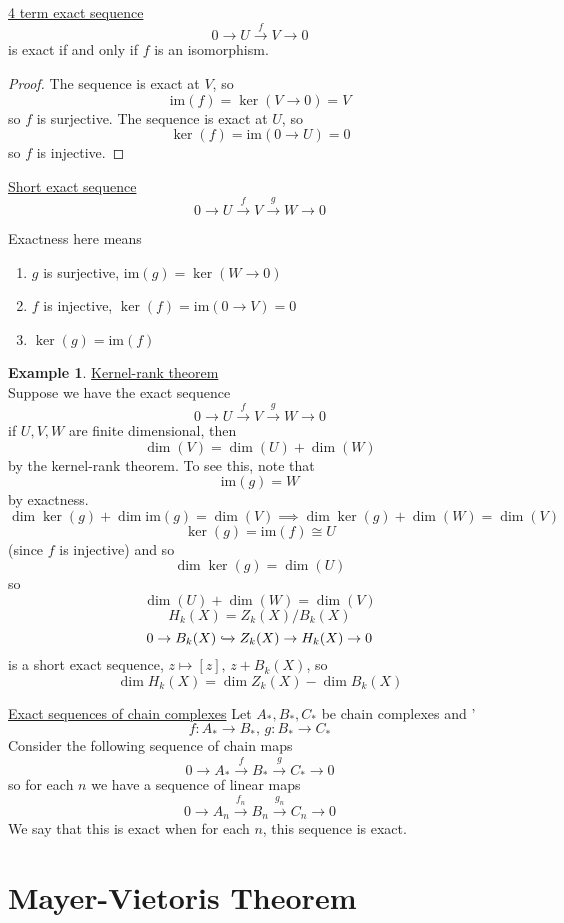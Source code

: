 \documentclass[a4paper,14pt]{extarticle}
\theoremstyle{definition}
\newtheorem*{eg}{Example}
\begin{document}
\noindent\underline{4 term exact sequence}
\[0\rightarrow U \xrightarrow{f} V\rightarrow 0\]
is exact if and only if $f$ is an isomorphism.

\begin{proof}
	The sequence is exact at $V$, so \[\text{im}(f)=\ker(V\rightarrow 0)=V\]
	so $f$ is surjective. The sequence is exact at $U$, so
	\[\ker(f)=\text{im}(0\rightarrow U)=0\] so $f$ is injective.
\end{proof}

\noindent\underline{Short exact sequence}
\[0\rightarrow U\xrightarrow{f} V\xrightarrow{g} W\rightarrow 0\]

Exactness here means
\begin{enumerate}
	\item $g$ is surjective, $\text{im}(g)=\ker(W\rightarrow 0)$
	\item $f$ is injective, $\ker(f)=\text{im}(0\rightarrow V)=0$
	\item $\ker(g)=\text{im}(f)$
\end{enumerate}

\begin{eg}
\underline{Kernel-rank theorem} \\
Suppose we have the exact sequence
\[0\rightarrow U\xrightarrow{f} V\xrightarrow{g} W\rightarrow 0\]
if $U,V,W$ are finite dimensional, then \[\dim(V)=\dim(U)+\dim(W)\] by the kernel-rank theorem.
To see this, note that \[\text{im}(g)=W\] by exactness.
\[\dim\ker(g)+\dim\text{im}(g)=\dim(V)\implies\dim\ker(g)+\dim(W)=\dim(V)\] \[\ker(g)=\text{im}(f)\cong U\] (since
$f$ is injective) and so 
\[\dim\ker(g)=\dim(U)\] so \[\dim(U)+\dim(W)=\dim(V)\]
\[H_k(X)=Z_k(X)/B_k(X)\]
\[0\rightarrow B_k(X)\xhookrightarrow{} Z_k(X)\rightarrow H_k(X)\rightarrow 0\]
is a short exact sequence, $z\mapsto[z], \,z+B_k(X)$, so 
\[\dim H_k(X)=\dim Z_k(X) - \dim B_k(X)\]
\end{eg}

\noindent\underline{Exact sequences of chain complexes}
Let $A_*,B_*,C_*$ be chain complexes and '
\[f:A_*\rightarrow B_*, \,g:B_*\rightarrow C_*\]
Consider the following sequence of chain maps
\[0\rightarrow A_*\xrightarrow{f} B_*\xrightarrow{g} C_*\rightarrow 0\]
so for each $n$ we have a sequence of linear maps
\[0\rightarrow A_n\xrightarrow{f_n} B_n\xrightarrow{g_n} C_n\rightarrow 0\]
We say that this is exact when for each $n$, this sequence is exact.

\section{Mayer-Vietoris Theorem}
\end{document}
